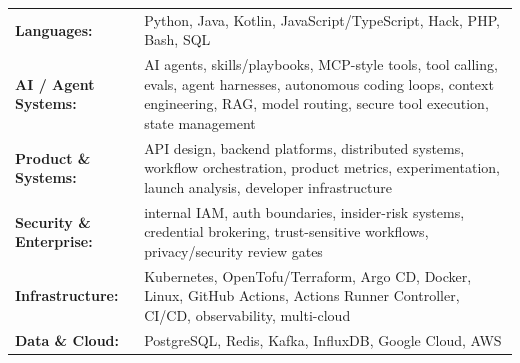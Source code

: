 {\renewcommand{\arraystretch}{1.25}%
\begin{tabularx}{\linewidth}{@{}>{\bfseries}l X@{}}
Languages: & Python, Java, Kotlin, JavaScript/TypeScript, Hack, PHP, Bash, SQL \\
AI / Agent Systems: & AI agents, skills/playbooks, MCP-style tools, tool calling, evals, agent harnesses, autonomous coding loops, context engineering, RAG, model routing, secure tool execution, state management \\
Product \& Systems: & API design, backend platforms, distributed systems, workflow orchestration, product metrics, experimentation, launch analysis, developer infrastructure \\
Security \& Enterprise: & internal IAM, auth boundaries, insider-risk systems, credential brokering, trust-sensitive workflows, privacy/security review gates \\
Infrastructure: & Kubernetes, OpenTofu/Terraform, Argo CD, Docker, Linux, GitHub Actions, Actions Runner Controller, CI/CD, observability, multi-cloud \\
Data \& Cloud: & PostgreSQL, Redis, Kafka, InfluxDB, Google Cloud, AWS \\
\end{tabularx}}
